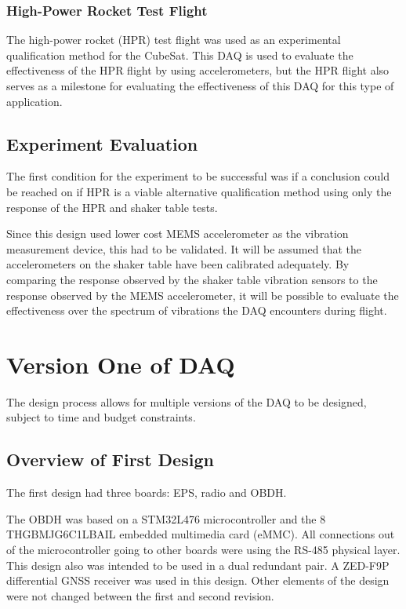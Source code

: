 \documentclass{report}
\begin{document}
\subsubsection{High-Power Rocket Test Flight}

The high-power rocket (HPR) test flight was used as an experimental qualification method for the CubeSat. This DAQ is used to evaluate the effectiveness of the HPR flight by using accelerometers, but the HPR flight also serves as a milestone for evaluating the effectiveness of this DAQ for this type of application.

\subsection{Experiment Evaluation}

The first condition for the experiment to be successful was if a conclusion could be reached on if HPR is a viable alternative qualification method using only the response of the HPR and shaker table tests.

Since this design used lower cost MEMS accelerometer as the vibration measurement device, this had to be validated. It will be assumed that the accelerometers on the shaker table have been calibrated adequately. By comparing the response observed by the shaker table vibration sensors to the response observed by the MEMS accelerometer, it will be possible to evaluate the effectiveness over the spectrum of vibrations the DAQ encounters during flight.

\section{Version One of DAQ}

The design process allows for multiple versions of the DAQ to be designed, subject to time and budget constraints.

\subsection{Overview of First Design}

The first design had three boards: EPS, radio and OBDH.

The OBDH was based on a STM32L476 microcontroller and the \SI{8}{\giga\bit} THGBMJG6C1LBAIL embedded multimedia card (eMMC). All connections out of the microcontroller going to other boards were using the RS-485 physical layer. This design also was intended to be used in a dual redundant pair. A ZED-F9P differential GNSS receiver was used in this design. Other elements of the design were not changed between the first and second revision.
\end{document}
